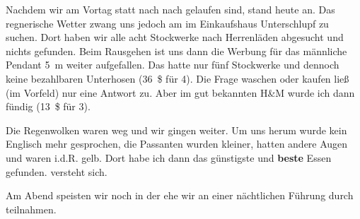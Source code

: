Nachdem wir am Vortag statt nach  nach  gelaufen sind, stand heute  an.
Das regnerische Wetter zwang uns jedoch am  im Einkaufshaus  Unterschlupf zu suchen.
Dort haben wir alle acht Stockwerke nach Herrenläden abgesucht und nichts gefunden.
Beim Rausgehen ist uns dann die Werbung für das männliche Pendant 5~m weiter aufgefallen.
Das hatte nur fünf Stockwerke und dennoch keine bezahlbaren Unterhosen (36~\$ für 4).
Die Frage waschen oder kaufen ließ (im Vorfeld) nur eine Antwort zu.
Aber im gut bekannten H\&M wurde ich dann fündig (13~\$ für 3).

Die Regenwolken waren weg und wir gingen weiter.
Um uns herum wurde kein Englisch mehr gesprochen, die Passanten wurden kleiner, hatten andere Augen und waren i.d.R. gelb.
Dort habe ich dann das günstigste und \textbf{beste} Essen gefunden.
 versteht sich.

Am Abend speisten wir noch in der  ehe wir an einer nächtlichen Führung durch  teilnahmen.